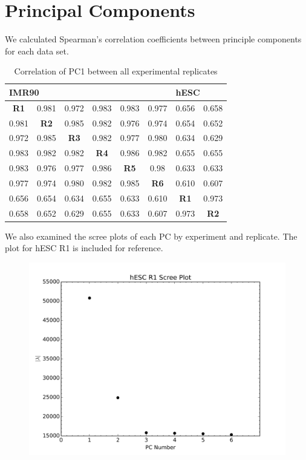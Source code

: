 \newpage
\section*{Principal Components}

We calculated Spearman's correlation coefficients between principle components for each data set.

\begin{table}[H]
  \centering
  \caption{Correlation of PC1 between all experimental replicates}\label{table:PC1Correlations}
  \begin{tabularx}{\textwidth}{@{}cccccccc@{}}
    \toprule
    \multicolumn{6}{l}{IMR90} & \multicolumn{2}{l}{hESC} \\
    \midrule
    \textbf{R1} & 0.981       & 0.972       & 0.983       & 0.983       & 0.977       & 0.656       & 0.658 \\
    0.981       & \textbf{R2} & 0.985       & 0.982       & 0.976       & 0.974       & 0.654       & 0.652 \\
    0.972       & 0.985       & \textbf{R3} & 0.982       & 0.977       & 0.980       & 0.634       & 0.629 \\
    0.983       & 0.982       & 0.982       & \textbf{R4} & 0.986       & 0.982       & 0.655       & 0.655 \\
    0.983       & 0.976       & 0.977       & 0.986       & \textbf{R5} & 0.98        & 0.633       & 0.633 \\
    0.977       & 0.974       & 0.980       & 0.982       & 0.985       & \textbf{R6} & 0.610       & 0.607 \\
    0.656       & 0.654       & 0.634       & 0.655       & 0.633       & 0.610       & \textbf{R1} & 0.973  \\
    0.658       & 0.652       & 0.629       & 0.655       & 0.633       & 0.607       & 0.973       & \textbf{R2}    \\
    \bottomrule
  \end{tabularx}
\end{table}

We also examined the scree plots of each \gls{PC} by experiment and replicate.  The plot for hESC R1 is included for reference.

\begin{figure}
  \centering
  \includegraphics[width=\textwidth]{./figures/supplementary/hESC-R1-scree.png}\label{fig:hESCScree}
\end{figure}

